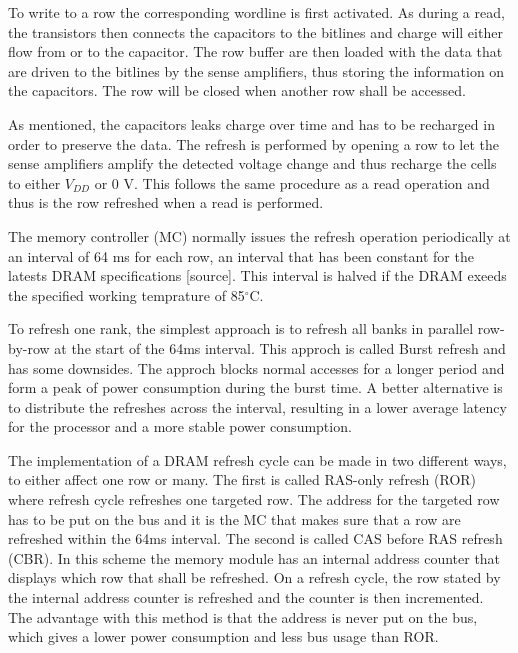 To write to a row the corresponding wordline is first activated. As during a read, the transistors then connects the capacitors to the bitlines and charge will either flow from or to the capacitor. The row buffer are then loaded with the data that are driven to the bitlines by the sense amplifiers, thus storing the information on the capacitors. The row will be closed when another row shall be accessed.

As mentioned, the capacitors leaks charge over time and has to be recharged in order to preserve the data. The refresh is performed by opening a row to let the sense amplifiers amplify the detected voltage change and thus recharge the cells to either \(V_{DD}\) or 0 V. This follows the same procedure as a read operation and thus is the row refreshed when a read is performed. 

The memory controller (MC) normally issues the refresh operation periodically at an interval of 64 ms for each row, an interval that has been constant for the latests DRAM specifications [source]. This interval is halved if the DRAM exeeds the specified working temprature of 85$^{\circ}$C. %

To refresh one rank, the simplest approach is to refresh all banks in parallel row-by-row at the start of the 64ms interval. This approch is called Burst refresh and has some downsides. The approch blocks normal accesses for a longer period and form a peak of power consumption during the burst time. A better alternative is to distribute the refreshes across the interval, resulting in a lower average latency for the processor and a more stable power consumption.

The implementation of a DRAM refresh cycle can be made in two different ways, to either affect one row or many. The first is called RAS-only refresh (ROR) where refresh cycle refreshes one targeted row. The address for the targeted row has to be put on the bus and it is the MC that makes sure that a row are refreshed within the 64ms interval. The second is called CAS before RAS refresh (CBR). In this scheme the memory module has an internal address counter that displays which row that shall be refreshed. On a refresh cycle, the row stated by the internal address counter is refreshed and the counter is then incremented. The advantage with this method is that the address is never put on the bus, which gives a lower power consumption and less bus usage than ROR. 

